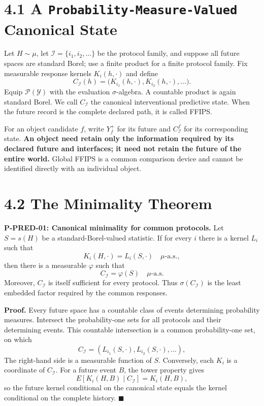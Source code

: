 \documentclass[
  english,
  11pt,
  oneside]{book}
\begin{document}
\section{\texorpdfstring{4.1 A \nolinkurl{Probability-Measure-Valued} Canonical State}{4.1 A  Canonical State}}\label{a-probability-measure-valued-canonical-state}

Let \(H\sim\mu\), let \(\mathcal I=\{i_1,i_2,\ldots\}\) be the protocol family, and suppose all future spaces are standard Borel; use a finite product for a finite protocol family. Fix measurable response kernels \(K_i(h,\cdot)\) and define \[C_{\mathcal I}(h)=\bigl(K_{i_1}(h,\cdot),K_{i_2}(h,\cdot),\ldots\bigr).\] Equip \(\mathcal P(\mathcal Y)\) with the evaluation \(\sigma\)-algebra. A countable product is again standard Borel. We call \(C_{\mathcal I}\) the canonical interventional predictive state. When the future record is the complete declared path, it is called FFIPS.

For an object candidate \(f\), write \(Y_f^+\) for its future and \(C^{f}_{\mathcal I}\) for its corresponding state. \textbf{An object need retain only the information required by its declared future and interfaces; it need not retain the future of the entire world.} Global FFIPS is a common comparison device and cannot be identified directly with an individual object.

\section{4.2 The Minimality Theorem}\label{the-minimality-theorem}

\hypertarget{p-pred-01}{}\label{p-pred-01}

\textbf{P-PRED-01: Canonical minimality for common protocols.} Let \(S=s(H)\) be a standard-Borel-valued statistic. If for every \(i\) there is a kernel \(L_i\) such that \[K_i(H,\cdot)=L_i(S,\cdot)\quad\mu\text{-a.s.},\] then there is a measurable \(\varphi\) such that \[C_{\mathcal I}=\varphi(S)\quad\mu\text{-a.s.}\] Moreover, \(C_{\mathcal I}\) is itself sufficient for every protocol. Thus \(\sigma(C_{\mathcal I})\) is the least embedded factor required by the common responses.

\textbf{Proof.} Every future space has a countable class of events determining probability measures. Intersect the probability-one sets for all protocols and their determining events. This countable intersection is a common probability-one set, on which \[C_{\mathcal I}=(L_{i_1}(S,\cdot),L_{i_2}(S,\cdot),\ldots),\] The right-hand side is a measurable function of \(S\). Conversely, each \(K_i\) is a coordinate of \(C_{\mathcal I}\). For a future event \(B\), the tower property gives \[E[K_i(H,B)\mid C_{\mathcal I}]=K_i(H,B),\] so the future kernel conditional on the canonical state equals the kernel conditional on the complete history. \(\blacksquare\)
\end{document}
